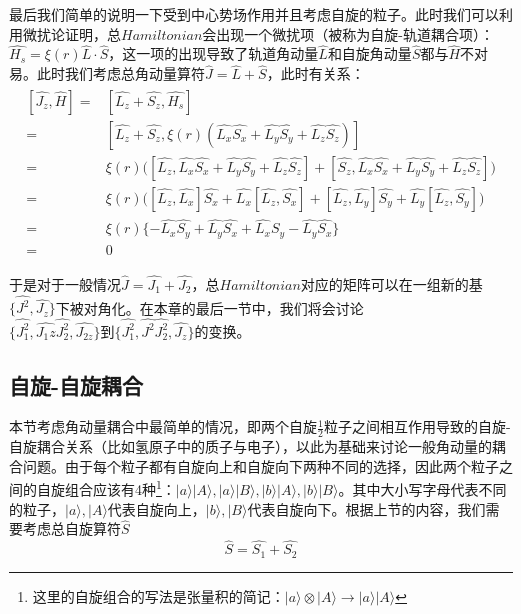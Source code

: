     最后我们简单的说明一下受到中心势场作用并且考虑自旋的粒子。此时我们可以利用微扰论证明，总$Hamiltonian$会出现一个微扰项（被称为自旋-轨道耦合项）：$\hat{H_s}=
    \xi(r)\hat{L}\cdot \hat{S}$，这一项的出现导致了轨道角动量$\hat{L}$和自旋角动量$\hat{S}$都与$\hat{H}$不对易。此时我们考虑总角动量算符$\hat{J}=\hat{L}+\hat{S}$，此时有关系：
    \begin{align}
        \begin{split}
            [\hat{J_z},\hat{H}]=&[\hat{L_z}+\hat{S_z},
            \hat{H_s}]\\
            =&[\hat{L_z}+\hat{S_z},
            \xi(r)(\hat{L_x}\hat{S_x}+\hat{L_y}\hat{S_y}+\hat{L_z}\hat{S_z})]\\
            =&\xi(r)\Big([\hat{L_z},
            \hat{L_x}\hat{S_x}+\hat{L_y}\hat{S_y}+\hat{L_z}\hat{S_z}]+[\hat{S_z},
           \hat{L_x}\hat{S_x}+\hat{L_y}\hat{S_y}+\hat{L_z}\hat{S_z}]\Big)\\
            =&\xi(r)\Big( [\hat{L_z},\hat{L_x}]\hat{S_x}+\hat{L_x}[\hat{L_z},\hat{S_x}]+[\hat{L_z},\hat{L_y}]\hat{S_y}+\hat{L_y}[\hat{L_z},\hat{S_y}] \Big)\\
            =&\xi(r)\{-\hat{L_x}\hat{S_y}+\hat{L_y}\hat{S_x}+\hat{L_x}\hat{S_y}-\hat{L_y}\hat{S_x} \}\\
            =&0
        \end{split}
    \end{align}
    
    于是对于一般情况$\hat{J}=\hat{J_1}+\hat{J_2}$，总$Hamiltonian$对应的矩阵可以在一组新的基$\{\hat{J^2},\hat{J_z}\}$下被对角化。在本章的最后一节中，我们将会讨论$\{\hat{J_1^2},\hat{J_1z}\hat{J_2^2},\hat{J_{2z}}\} \textrm{到}\{ \hat{J_1^2},\hat{J^2}\hat{J_2^2},\hat{J_z}\}$的变换。
    
    
    \subsection{自旋-自旋耦合}
    本节考虑角动量耦合中最简单的情况，即两个自旋$\frac{1}{2}$粒子之间相互作用导致的自旋-自旋耦合关系（比如氢原子中的质子与电子），以此为基础来讨论一般角动量的耦合问题。由于每个粒子都有自旋向上和自旋向下两种不同的选择，因此两个粒子之间的自旋组合应该有4种\footnote{这里的自旋组合的写法是张量积的简记：$|a\rangle\otimes|A\rangle\rightarrow|a\rangle|A\rangle$}：$|a\rangle|A\rangle,|a\rangle|B\rangle,|b\rangle|A\rangle,|b\rangle|B\rangle$。其中大小写字母代表不同的粒子，$|a\rangle,|A\rangle$代表自旋向上，$|b\rangle,|B\rangle$代表自旋向下。根据上节的内容，我们需要考虑总自旋算符$\hat{S}$
    \begin{equation}
        \hat{S}=\hat{S_1}+\hat{S_2}
    \end{equation}
    
